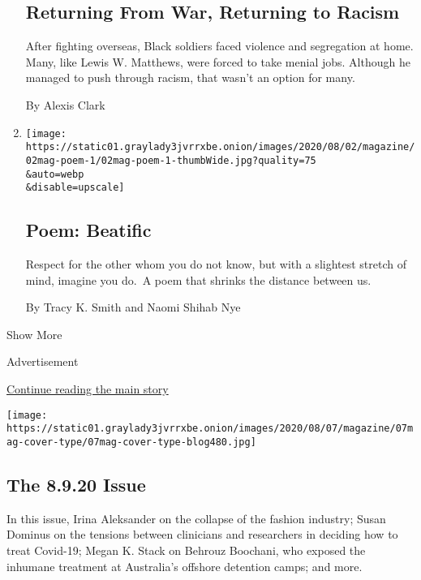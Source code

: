\begin{enumerate}
{  \subsection{Returning From War, Returning to
  Racism}\label{returning-from-war-returning-to-racism}}

  After fighting overseas, Black soldiers faced violence and segregation
  at home. Many, like Lewis W. Matthews, were forced to take menial
  jobs. Although he managed to push through racism, that wasn't an
  option for many.

  By Alexis Clark
\item
  \href{/2020/07/30/magazine/poem-beatific.html}{}

  \texttt{[image: https://static01.graylady3jvrrxbe.onion/images/2020/08/02/magazine/02mag-poem-1/02mag-poem-1-thumbWide.jpg?quality=75\\\&auto=webp\\\&disable=upscale]}

  \hypertarget{poem-beatific}{%
  \subsection{Poem: Beatific}\label{poem-beatific}}

  Respect for the other whom you do not know, but with a slightest
  stretch of mind, imagine you do.~A poem that shrinks the distance
  between us.

  By Tracy K. Smith and Naomi Shihab Nye
\end{enumerate}

Show More

Advertisement

\protect\hyperlink{after-mid2}{Continue reading the main story}

\href{https://www.nytimes3xbfgragh.onion/issue/magazine/2020/08/07/the-8920-issue}{}

\texttt{[image: https://static01.graylady3jvrrxbe.onion/images/2020/08/07/magazine/07mag-cover-type/07mag-cover-type-blog480.jpg]}

\href{https://www.nytimes3xbfgragh.onion/issue/magazine/2020/08/07/the-8920-issue}{}

\hypertarget{the-8920-issue}{%
\subsection{The 8.9.20 Issue}\label{the-8920-issue}}

In this issue, Irina Aleksander on the collapse of the fashion industry;
Susan Dominus on the tensions between clinicians and researchers in
deciding how to treat Covid-19; Megan K. Stack on Behrouz Boochani, who
exposed the inhumane treatment at Australia's offshore detention camps;
and more.

